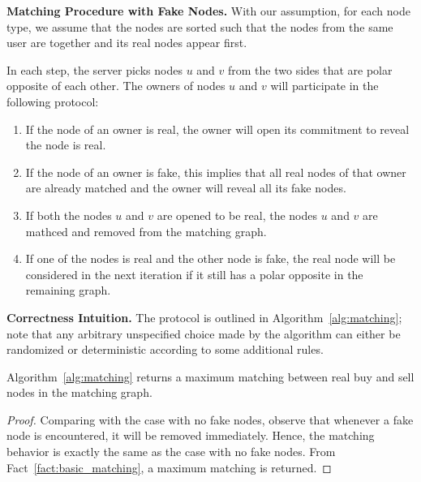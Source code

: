 

\noindent \textbf{Matching Procedure with Fake Nodes.}
With our assumption, for each node type,
we assume that the nodes are sorted such that
the nodes from the same user are together and its real nodes appear first.

In each step, the server picks nodes $u$ and $v$ from the two sides
that are polar opposite of each other.
The owners of nodes $u$ and $v$ will participate in the following protocol:

\begin{enumerate}

\item If the node of an owner is real,
the owner will open its commitment to reveal the node is real.

\item If the node of an owner is fake,
this implies that all real nodes of that owner are already
matched and the owner will reveal all its fake nodes.




\item If both the nodes $u$ and $v$ are opened to be real,
the nodes $u$ and $v$ are mathced and removed from the matching graph.

\item If one of the nodes is real and the other node is fake,
the real node will be considered in the next iteration if it still has
a polar opposite in the remaining graph.

\end{enumerate}

\noindent \textbf{Correctness Intuition.}  The protocol
is outlined in Algorithm~\ref{alg:matching};
note that any arbitrary unspecified choice made by the algorithm
can either be randomized or deterministic according to some additional rules.

\begin{lemma}
Algorithm~\ref{alg:matching} returns
a maximum matching between real buy and sell nodes in the matching graph.
\end{lemma}

\begin{proof}
Comparing with the case with no fake nodes,
observe that whenever a fake node is encountered,
it will be removed immediately.  Hence, the matching behavior
is exactly the same as the case with no fake nodes.
From Fact~\ref{fact:basic_matching},
a maximum matching is returned.
\end{proof}



